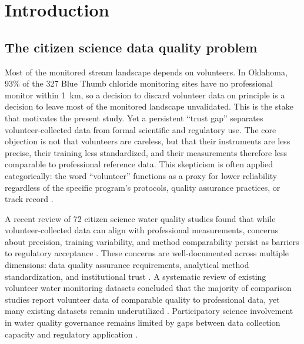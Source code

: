 \documentclass[lineno]{wlpeerj}
\begin{document}
\flushbottom
\maketitle
\thispagestyle{empty}

\section{Introduction}

\subsection{The citizen science data quality problem}

Most of the monitored stream landscape depends on volunteers. In Oklahoma, 93\% of the 327 Blue Thumb chloride monitoring sites have no professional monitor within 1~km, so a decision to discard volunteer data on principle is a decision to leave most of the monitored landscape unvalidated. This is the stake that motivates the present study. Yet a persistent ``trust gap'' separates volunteer-collected data from formal scientific and regulatory use. The core objection is not that volunteers are careless, but that their instruments are less precise, their training less standardized, and their measurements therefore less comparable to professional reference data. This skepticism is often applied categorically: the word ``volunteer'' functions as a proxy for lower reliability regardless of the specific program's protocols, quality assurance practices, or track record \citep{Metcalfe2022}.

A recent review of 72 citizen science water quality studies found that while volunteer-collected data can align with professional measurements, concerns about precision, training variability, and method comparability persist as barriers to regulatory acceptance \citep{BlancoRamirez2023}. These concerns are well-documented across multiple dimensions: data quality assurance requirements, analytical method standardization, and institutional trust \citep{SanLlorenteCapdevila2020}. A systematic review of existing volunteer water monitoring datasets concluded that the majority of comparison studies report volunteer data of comparable quality to professional data, yet many existing datasets remain underutilized \citep{Albus2019}. Participatory science involvement in water quality governance remains limited by gaps between data collection capacity and regulatory application \citep{ORyan2025}.
\end{document}
